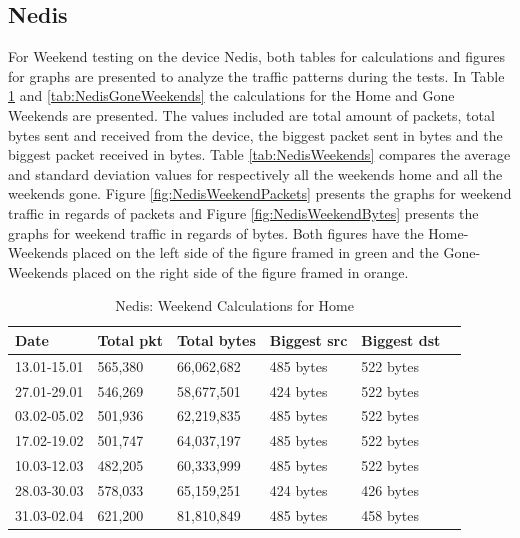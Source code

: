 \subsection{Nedis}
For Weekend testing on the device Nedis, both tables for calculations and figures for graphs are presented to analyze the traffic patterns during the tests. In Table \ref{tab:NedisHomeWeekends} and \ref{tab:NedisGoneWeekends} the calculations for the Home and Gone Weekends are presented. The values included are total amount of packets, total bytes sent and received from the device, the biggest packet sent in bytes and the biggest packet received in bytes. Table \ref{tab:NedisWeekends} compares the average and standard deviation values for respectively all the weekends home and all the weekends gone. Figure \ref{fig:NedisWeekendPackets} presents the graphs for weekend traffic in regards of packets and Figure \ref{fig:NedisWeekendBytes} presents the graphs for weekend traffic in regards of bytes. Both figures have the Home-Weekends placed on the left side of the figure framed in green and the Gone-Weekends placed on the right side of the figure framed in orange.  

\begin{table}[H]
    \caption{Nedis: Weekend Calculations for Home}
    \begin{tabular}{|l|l|l|l|l|l|}
        \hline
        \textbf{Date}    & \textbf{Total pkt} & \textbf{Total bytes} & \textbf{Biggest src} & \textbf{Biggest dst} \\ \hline
        13.01-15.01      & 565,380            & 66,062,682           & 485 bytes            & 522 bytes            \\ \hline
        27.01-29.01      & 546,269            & 58,677,501           & 424 bytes            & 522 bytes            \\ \hline
        03.02-05.02      & 501,936            & 62,219,835           & 485 bytes            &    522 bytes            \\ \hline
        17.02-19.02      & 501,747            & 64,037,197           & 485 bytes            & 522 bytes            \\ \hline
        10.03-12.03      & 482,205            & 60,333,999           & 485 bytes            & 522 bytes            \\ \hline
        28.03-30.03      & 578,033            & 65,159,251           & 424 bytes            & 426 bytes            \\ \hline
        31.03-02.04      & 621,200            & 81,810,849           & 485 bytes            & 458 bytes            \\ \hline
    \end{tabular}
    \label{tab:NedisHomeWeekends}
\end{table}

